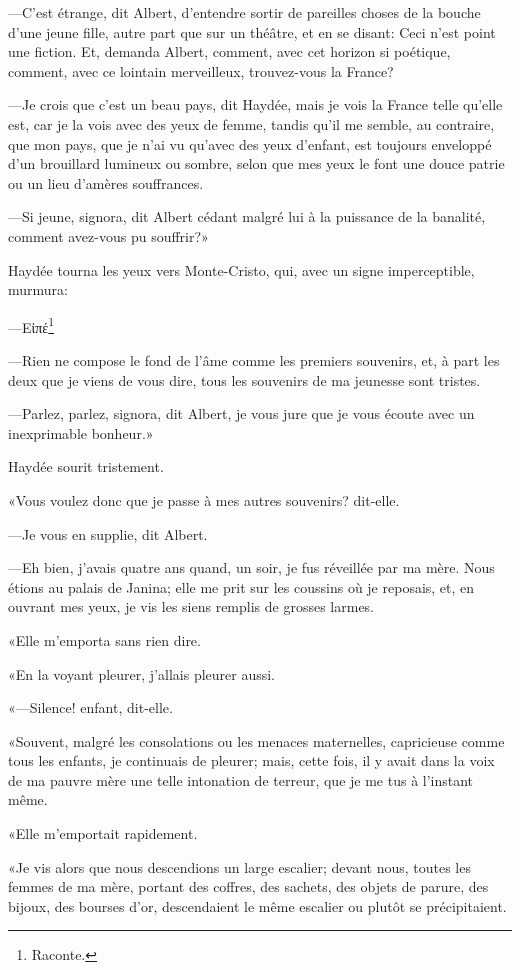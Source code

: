 —C'est étrange, dit Albert, d'entendre sortir de pareilles choses de la bouche d'une jeune fille, autre part que sur un théâtre, et en se disant: Ceci n'est point une fiction. Et, demanda Albert, comment, avec cet horizon si poétique, comment, avec ce lointain merveilleux, trouvez-vous la France? 

—Je crois que c'est un beau pays, dit Haydée, mais je vois la France telle qu'elle est, car je la vois avec des yeux de femme, tandis qu'il me semble, au contraire, que mon pays, que je n'ai vu qu'avec des yeux d'enfant, est toujours enveloppé d'un brouillard lumineux ou sombre, selon que mes yeux le font une douce patrie ou un lieu d'amères souffrances. 

—Si jeune, signora, dit Albert cédant malgré lui à la puissance de la banalité, comment avez-vous pu souffrir?» 

Haydée tourna les yeux vers Monte-Cristo, qui, avec un signe imperceptible, murmura:  

 —Εἰπέ\footnote{Raconte.}   

—Rien ne compose le fond de l'âme comme les premiers souvenirs, et, à part les deux que je viens de vous dire, tous les souvenirs de ma jeunesse sont tristes. 

—Parlez, parlez, signora, dit Albert, je vous jure que je vous écoute avec un inexprimable bonheur.» 

Haydée sourit tristement. 

«Vous voulez donc que je passe à mes autres souvenirs? dit-elle. 

—Je vous en supplie, dit Albert. 

—Eh bien, j'avais quatre ans quand, un soir, je fus réveillée par ma mère. Nous étions au palais de Janina; elle me prit sur les coussins où je reposais, et, en ouvrant mes yeux, je vis les siens remplis de grosses larmes. 

«Elle m'emporta sans rien dire. 

«En la voyant pleurer, j'allais pleurer aussi. 

«—Silence! enfant, dit-elle. 

«Souvent, malgré les consolations ou les menaces maternelles, capricieuse comme tous les enfants, je continuais de pleurer; mais, cette fois, il y avait dans la voix de ma pauvre mère une telle intonation de terreur, que je me tus à l'instant même. 

«Elle m'emportait rapidement. 

«Je vis alors que nous descendions un large escalier; devant nous, toutes les femmes de ma mère, portant des coffres, des sachets, des objets de parure, des bijoux, des bourses d'or, descendaient le même escalier ou plutôt se précipitaient. 


